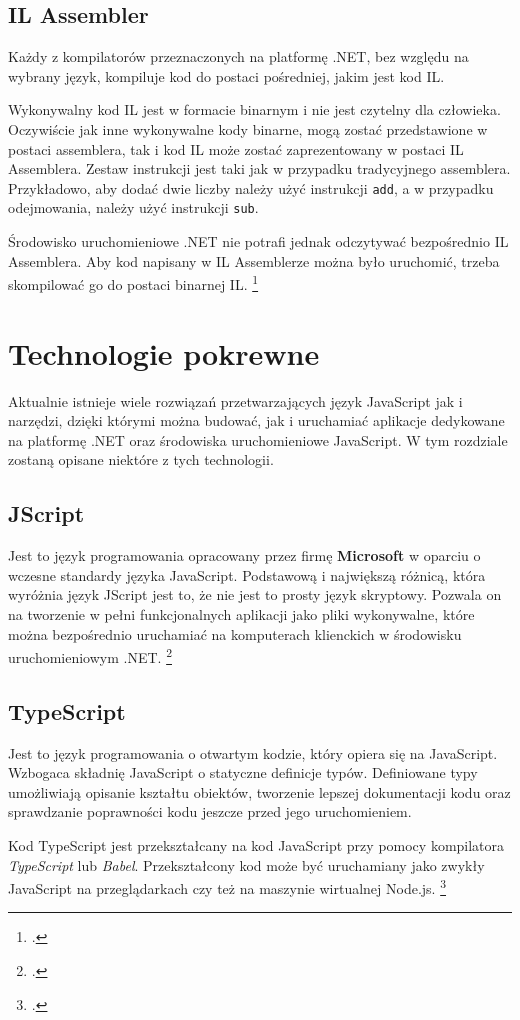 \subsection{IL Assembler}
\par Każdy z kompilatorów przeznaczonych na platformę .NET, bez względu na wybrany język, kompiluje kod do postaci pośredniej, jakim jest kod IL.
\par Wykonywalny kod IL jest w formacie binarnym i nie jest czytelny dla człowieka. Oczywiście jak inne wykonywalne kody binarne, mogą zostać przedstawione w postaci assemblera, tak i kod IL może zostać zaprezentowany w postaci IL Assemblera. Zestaw instrukcji jest taki jak w przypadku tradycyjnego assemblera. Przykładowo, aby dodać dwie liczby należy użyć instrukcji \texttt{add}, a w przypadku odejmowania, należy użyć instrukcji \texttt{sub}.
\par Środowisko uruchomieniowe .NET nie potrafi jednak odczytywać bezpośrednio IL Assemblera. Aby kod napisany w IL Assemblerze można było uruchomić, trzeba skompilować go do postaci binarnej IL. \footcite{ILAsm1}

\section{Technologie pokrewne}
Aktualnie istnieje wiele rozwiązań przetwarzających język JavaScript jak i narzędzi, dzięki którymi można budować, jak i uruchamiać aplikacje dedykowane na platformę .NET oraz środowiska uruchomieniowe JavaScript. W tym rozdziale zostaną opisane niektóre z tych technologii.

\subsection{JScript}
\par Jest to język programowania opracowany przez firmę \textbf{Microsoft} w oparciu o wczesne standardy języka JavaScript. Podstawową i największą różnicą, która wyróżnia język JScript jest to, że nie jest to prosty język skryptowy. Pozwala on na tworzenie w pełni funkcjonalnych aplikacji jako pliki wykonywalne, które można bezpośrednio uruchamiać na komputerach klienckich w środowisku uruchomieniowym .NET. \footcite{jscript}

\subsection{TypeScript}
\par Jest to język programowania o otwartym kodzie, który opiera się na JavaScript. Wzbogaca składnię JavaScript o statyczne definicje typów. Definiowane typy umożliwiają opisanie kształtu obiektów, tworzenie lepszej dokumentacji kodu oraz sprawdzanie poprawności kodu jeszcze przed jego uruchomieniem. 
\par Kod TypeScript jest przekształcany na kod JavaScript przy pomocy kompilatora \textit{TypeScript} lub \textit{Babel}. Przekształcony kod może być uruchamiany jako zwykły JavaScript na przeglądarkach czy też na maszynie wirtualnej Node.js. \footcite{typescript}

